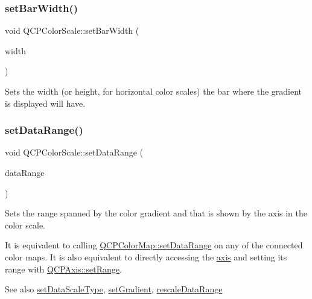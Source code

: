 \subsubsection{\texorpdfstring{set\+Bar\+Width()}{setBarWidth()}}
{\footnotesize\ttfamily void Q\+C\+P\+Color\+Scale\+::set\+Bar\+Width (\begin{DoxyParamCaption}\item[{int}]{width }\end{DoxyParamCaption})}

Sets the width (or height, for horizontal color scales) the bar where the gradient is displayed will have. \mbox{\label{class_q_c_p_color_scale_abe88633003a26d1e756aa74984587fef}} 
\subsubsection{\texorpdfstring{set\+Data\+Range()}{setDataRange()}}
{\footnotesize\ttfamily void Q\+C\+P\+Color\+Scale\+::set\+Data\+Range (\begin{DoxyParamCaption}\item[{const \hyperlink{class_q_c_p_range}{Q\+C\+P\+Range} \&}]{data\+Range }\end{DoxyParamCaption})}

Sets the range spanned by the color gradient and that is shown by the axis in the color scale.

It is equivalent to calling \hyperlink{class_q_c_p_color_map_a980b42837821159786a85b4b7dcb8774}{Q\+C\+P\+Color\+Map\+::set\+Data\+Range} on any of the connected color maps. It is also equivalent to directly accessing the \hyperlink{class_q_c_p_color_scale_a39bdbdb3b212602a5a57f9f3ea444190}{axis} and setting its range with \hyperlink{class_q_c_p_axis_aebdfea5d44c3a0ad2b4700cd4d25b641}{Q\+C\+P\+Axis\+::set\+Range}.

\begin{DoxySeeAlso}{See also}
\hyperlink{class_q_c_p_color_scale_aeb6107d67dd7325145b2498abae67fc3}{set\+Data\+Scale\+Type}, \hyperlink{class_q_c_p_color_scale_a1f29583bb6f1e7f473b62fb712be3940}{set\+Gradient}, \hyperlink{class_q_c_p_color_scale_a425983db4478543924ddbd04ea20a356}{rescale\+Data\+Range} 
\end{DoxySeeAlso}
\mbox{\label{class_q_c_p_color_scale_aeb6107d67dd7325145b2498abae67fc3}} 
